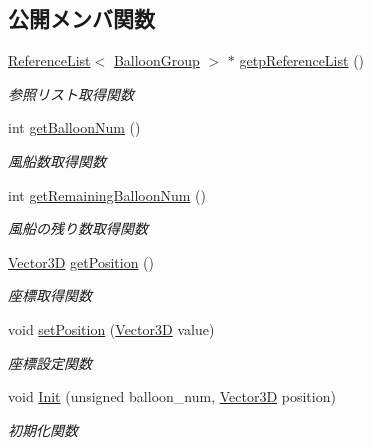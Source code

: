 \subsection*{公開メンバ関数}
\begin{DoxyCompactItemize}
\item 
\mbox{\hyperlink{class_reference_list}{Reference\+List}}$<$ \mbox{\hyperlink{class_balloon_group}{Balloon\+Group}} $>$ $\ast$ \mbox{\hyperlink{class_balloon_group_aa32071776f49db498c51e71d39ba0f19}{getp\+Reference\+List}} ()
\begin{DoxyCompactList}\small\item\em 参照リスト取得関数 \end{DoxyCompactList}\item 
int \mbox{\hyperlink{class_balloon_group_acb54ba4e3355015eb24a2090c87e209f}{get\+Balloon\+Num}} ()
\begin{DoxyCompactList}\small\item\em 風船数取得関数 \end{DoxyCompactList}\item 
int \mbox{\hyperlink{class_balloon_group_ae70b007902b2f9f2d4452f26c98dcca9}{get\+Remaining\+Balloon\+Num}} ()
\begin{DoxyCompactList}\small\item\em 風船の残り数取得関数 \end{DoxyCompactList}\item 
\mbox{\hyperlink{class_vector3_d}{Vector3D}} \mbox{\hyperlink{class_balloon_group_ac0ffe27fcf8966d7017fd8f0c3efc7d7}{get\+Position}} ()
\begin{DoxyCompactList}\small\item\em 座標取得関数 \end{DoxyCompactList}\item 
void \mbox{\hyperlink{class_balloon_group_a6f62d77c2467b0b54f311daca117a0aa}{set\+Position}} (\mbox{\hyperlink{class_vector3_d}{Vector3D}} value)
\begin{DoxyCompactList}\small\item\em 座標設定関数 \end{DoxyCompactList}\item 
void \mbox{\hyperlink{class_balloon_group_afbfc2425d41c42f70116f3f6f352c1c0}{Init}} (unsigned balloon\+\_\+num, \mbox{\hyperlink{class_vector3_d}{Vector3D}} position)
\begin{DoxyCompactList}\small\item\em 初期化関数 \end{DoxyCompactList}\item 

\end{DoxyCompactItemize}
